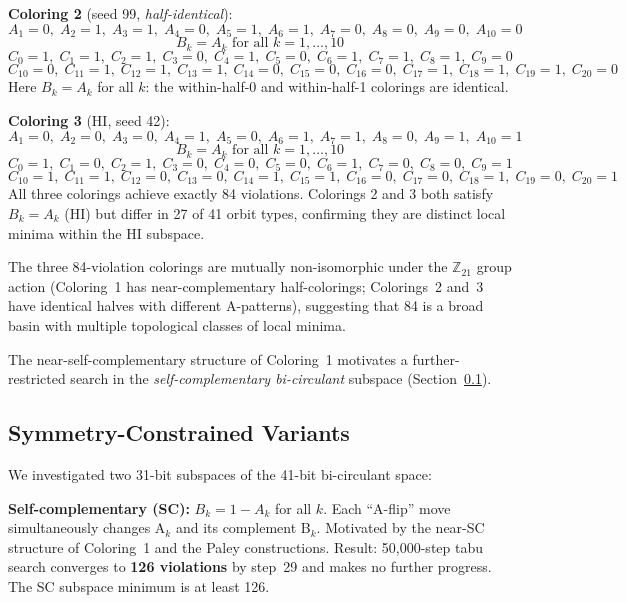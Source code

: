 \documentclass[11pt]{article}
\begin{document}
\textbf{Coloring 2} (seed 99, \emph{half-identical}):
\[
A_1\!=\!0,\; A_2\!=\!1,\; A_3\!=\!1,\; A_4\!=\!0,\; A_5\!=\!1,\;
A_6\!=\!1,\; A_7\!=\!0,\; A_8\!=\!0,\; A_9\!=\!0,\; A_{10}\!=\!0
\]
\[
B_k\!=\!A_k \text{ for all } k=1,\ldots,10
\]
\[
C_0\!=\!1,\; C_1\!=\!1,\; C_2\!=\!1,\; C_3\!=\!0,\; C_4\!=\!1,\;
C_5\!=\!0,\; C_6\!=\!1,\; C_7\!=\!1,\; C_8\!=\!1,\; C_9\!=\!0
\]
\[
C_{10}\!=\!0,\; C_{11}\!=\!1,\; C_{12}\!=\!1,\; C_{13}\!=\!1,\; C_{14}\!=\!0,\;
C_{15}\!=\!0,\; C_{16}\!=\!0,\; C_{17}\!=\!1,\; C_{18}\!=\!1,\; C_{19}\!=\!1,\; C_{20}\!=\!0
\]
Here $B_k = A_k$ for all $k$: the within-half-0 and within-half-1 colorings
are identical.

\textbf{Coloring 3} (HI, seed 42):
\[
A_1\!=\!0,\; A_2\!=\!0,\; A_3\!=\!0,\; A_4\!=\!1,\; A_5\!=\!0,\;
A_6\!=\!1,\; A_7\!=\!1,\; A_8\!=\!0,\; A_9\!=\!1,\; A_{10}\!=\!1
\]
\[
B_k\!=\!A_k \text{ for all } k=1,\ldots,10
\]
\[
C_0\!=\!1,\; C_1\!=\!0,\; C_2\!=\!1,\; C_3\!=\!0,\; C_4\!=\!0,\;
C_5\!=\!0,\; C_6\!=\!1,\; C_7\!=\!0,\; C_8\!=\!0,\; C_9\!=\!1
\]
\[
C_{10}\!=\!1,\; C_{11}\!=\!1,\; C_{12}\!=\!0,\; C_{13}\!=\!0,\; C_{14}\!=\!1,\;
C_{15}\!=\!1,\; C_{16}\!=\!0,\; C_{17}\!=\!0,\; C_{18}\!=\!1,\; C_{19}\!=\!0,\; C_{20}\!=\!1
\]
All three colorings achieve exactly 84 violations.
Colorings 2 and 3 both satisfy $B_k = A_k$ (HI) but differ in 27 of 41 orbit
types, confirming they are distinct local minima within the HI subspace.

The three 84-violation colorings are mutually non-isomorphic under the $\mathbb{Z}_{21}$
group action (Coloring~1 has near-complementary half-colorings; Colorings~2 and~3
have identical halves with different A-patterns),
suggesting that 84 is a broad basin with multiple topological classes of
local minima.

The near-self-complementary structure of Coloring~1 motivates a further-restricted search
in the \emph{self-complementary bi-circulant} subspace (Section~\ref{sec:sc}).

\subsection{Symmetry-Constrained Variants}
\label{sec:sc}

We investigated two 31-bit subspaces of the 41-bit bi-circulant space:

\textbf{Self-complementary (SC):} $B_k = 1-A_k$ for all $k$.
Each ``A-flip'' move simultaneously changes A$_k$ and its complement B$_k$.
Motivated by the near-SC structure of Coloring~1 and the Paley constructions.
Result: 50,000-step tabu search converges to \textbf{126 violations} by step~29
and makes no further progress. The SC subspace minimum is at least 126.
\end{document}
